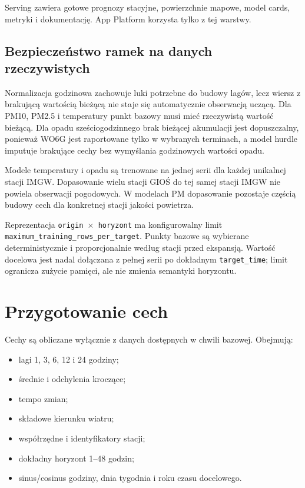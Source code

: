 \documentclass[11pt,a4paper,oneside]{article}
\begin{document}
Serving zawiera gotowe prognozy stacyjne, powierzchnie mapowe, model cards,
metryki i dokumentację. App Platform korzysta tylko z tej warstwy.

\subsection{Bezpieczeństwo ramek na danych rzeczywistych}

Normalizacja godzinowa zachowuje luki potrzebne do budowy lagów, lecz wiersz
z brakującą wartością bieżącą nie staje się automatycznie obserwacją uczącą.
Dla PM10, PM2.5 i temperatury punkt bazowy musi mieć rzeczywistą wartość
bieżącą. Dla opadu sześciogodzinnego brak bieżącej akumulacji jest dopuszczalny,
ponieważ WO6G jest raportowane tylko w wybranych terminach, a model hurdle
imputuje brakujące cechy bez wymyślania godzinowych wartości opadu.

Modele temperatury i opadu są trenowane na jednej serii dla każdej unikalnej
stacji IMGW. Dopasowanie wielu stacji GIOŚ do tej samej stacji IMGW nie powiela
obserwacji pogodowych. W modelach PM dopasowanie pozostaje częścią budowy cech
dla konkretnej stacji jakości powietrza.

Reprezentacja \texttt{origin $\times$ horyzont} ma konfigurowalny limit
\texttt{maximum\_training\_rows\_per\_target}. Punkty bazowe są wybierane
deterministycznie i proporcjonalnie według stacji przed ekspansją. Wartość
docelowa jest nadal dołączana z pełnej serii po dokładnym
\texttt{target\_time}; limit ogranicza zużycie pamięci, ale nie zmienia
semantyki horyzontu.

\section{Przygotowanie cech}

Cechy są obliczane wyłącznie z danych dostępnych w chwili bazowej. Obejmują:
\begin{itemize}[nosep]
  \item lagi 1, 3, 6, 12 i 24 godziny;
  \item średnie i odchylenia kroczące;
  \item tempo zmian;
  \item składowe kierunku wiatru;
  \item współrzędne i identyfikatory stacji;
  \item dokładny horyzont 1--48 godzin;
  \item sinus/cosinus godziny, dnia tygodnia i roku czasu docelowego.
\end{itemize}
\end{document}
